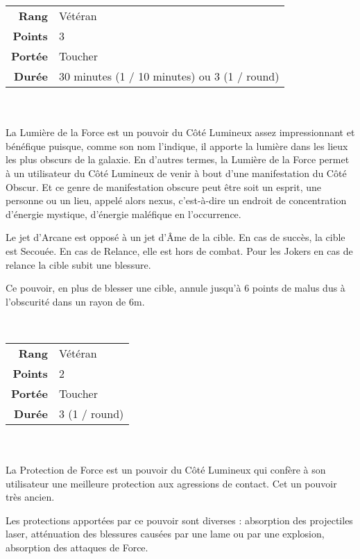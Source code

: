 \begin{description}[align=left]
        \begin{tabular}{ r l }
            \textbf{Rang}    & Vétéran \\
            \textbf{Points}  & 3 \\
            \textbf{Portée}  & Toucher \\
            \textbf{Durée}   & 30 minutes (1 / 10 minutes) ou 3 (1 / round) \\
        \end{tabular}
        \\ \\
        La Lumière de la Force est un pouvoir du Côté Lumineux assez impressionnant et bénéfique puisque, comme son nom l’indique, il apporte la lumière dans les lieux les plus obscurs de la galaxie. En d’autres termes, la Lumière de la Force permet à un utilisateur du Côté Lumineux de venir à bout d’une manifestation du Côté Obscur. Et ce genre de manifestation obscure peut être soit un esprit, une personne ou un lieu, appelé alors nexus, c’est-à-dire un endroit de concentration d’énergie mystique, d’énergie maléfique en l’occurrence.

        Le jet d’Arcane est opposé à un jet d’\^Ame de la cible. En cas de succès, la cible est Secouée. En cas de Relance, elle est hors de combat. Pour les Jokers en cas de relance la cible subit une blessure.

        Ce pouvoir, en plus de blesser une cible, annule jusqu’à 6 points de malus dus à l’obscurité dans un rayon de 6m.
        \\

    \item [Protection de Force] ~ \\

        \begin{tabular}{ r l }
            \textbf{Rang}    & Vétéran \\
            \textbf{Points}  & 2 \\
            \textbf{Portée}  & Toucher \\
            \textbf{Durée}   & 3 (1 / round) \\
        \end{tabular}
        \\ \\
        La Protection de Force est un pouvoir du Côté Lumineux qui confère à son utilisateur une meilleure protection aux agressions de contact. Cet un pouvoir très ancien.

        Les protections apportées par ce pouvoir sont diverses : absorption des projectiles laser, atténuation des blessures causées par une lame ou par une explosion, absorption des attaques de Force.


\end{description}
